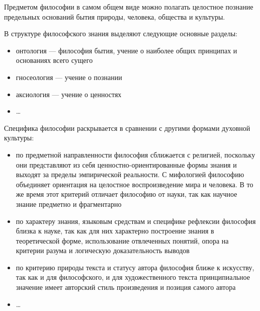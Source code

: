 Предметом философии в самом общем виде можно полагать целостное познание предельных оснований бытия природы, человека, общества и культуры.

В структуре философского знания выделяют следующие основные разделы:
\begin{itemize}
	\item онтология --- философия бытия, учение о наиболее общих принципах и основаниях всего сущего
	\item гносеология --- учение о познании
	\item аксиология --- учение о ценностях
	\item \ldots
\end{itemize}

Специфика философии раскрывается в сравнении с другими формами духовной культуры:
\begin{itemize}
	\item по предметной направленности философия сближается с религией, поскольку они представляют из себя ценностно-ориентированные формы знания и выходят за пределы эмпирической реальности. С мифологией философию объединяет ориентация на целостное воспроизведение мира и человека. В то же время этот критерий отличает философию от науки, так как научное знание предметно и фрагментарно
	\item по характеру знания, языковым средствам и специфике рефлексии философия близка к науке, так как для них характерно построение знания в теоретической форме, использование отвлеченных понятий, опора на критерии разума и логическую доказательность выводов
	\item по критерию природы текста и статусу автора философия ближе к искусству, так как и для философского, и для художественного текста принципиальное значение имеет авторский стиль произведения и позиция самого автора
	\item \ldots
\end{itemize}